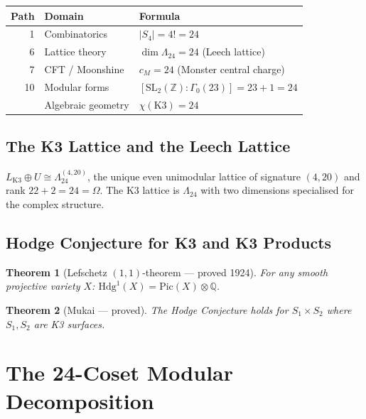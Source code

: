 \documentclass[12pt,a4paper]{article}
\newtheorem{theorem}{Theorem}[section]
\begin{document}
\begin{center}\small
\begin{tabular}{rll}
\toprule
Path & Domain & Formula \\
\midrule
1 & Combinatorics & $|S_4| = 4! = 24$ \\
6 & Lattice theory & $\dim\Lambda_{24} = 24$ (Leech lattice) \\
7 & CFT / Moonshine & $c_M = 24$ (Monster central charge) \\
10 & Modular forms & $[\text{SL}_2(\mathbb{Z}):\Gamma_0(23)] = 23 + 1 = 24$ \\
& Algebraic geometry & $\chi(\text{K3}) = 24$ \\
\bottomrule
\end{tabular}
\end{center}

\subsection{The K3 Lattice and the Leech Lattice}

$L_{\text{K3}} \oplus U \cong \Lambda_{24}^{(4,20)}$, the unique even unimodular lattice of signature $(4,20)$ and rank $22 + 2 = 24 = \Omega$. The K3 lattice is $\Lambda_{24}$ with two dimensions specialised for the complex structure.

\subsection{Hodge Conjecture for K3 and K3 Products}

\begin{theorem}[Lefschetz $(1,1)$-theorem --- proved 1924]
For any smooth projective variety $X$: $\text{Hdg}^1(X) = \text{Pic}(X) \otimes \mathbb{Q}$.
\end{theorem}

\begin{theorem}[Mukai \cite{Mukai1987} --- proved]
The Hodge Conjecture holds for $S_1 \times S_2$ where $S_1, S_2$ are K3 surfaces.
\end{theorem}

\section{The 24-Coset Modular Decomposition}
\end{document}
